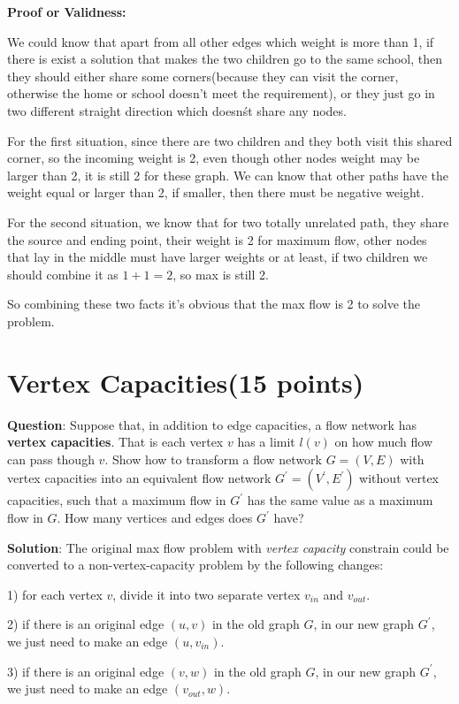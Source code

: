 \documentclass{article}
\begin{document}
\textbf{Proof or Validness:}

We could know that apart from all other edges which weight is more than 1, if there is exist a solution that makes the
two children go to the same school, then they should either share some corners(because they can visit the corner, otherwise the home or school doesn't meet the requirement), or they just go in two different straight direction which
doesn\'st share any nodes.

For the first situation, since there are two children and they both visit this shared corner, so the incoming weight is
2, even though other nodes weight may be larger than 2, it is still 2 for these graph. We can know that other paths have
the weight equal or larger than 2, if smaller, then there must be negative weight.

For the second situation, we know that for two totally unrelated path, they share the source and ending point, their weight is 2 for maximum flow, other nodes that lay in the middle must have larger weights or at least, if two children we should combine it as $ 1 + 1 = 2 $, so max is still 2. 

So combining these two facts it's obvious that the max flow is 2 to solve the problem.

\section{Vertex Capacities(15 points)}
\textbf{Question}: Suppose that, in addition to edge capacities, a flow network has \textbf{vertex capacities}. That is each vertex $v$ has a limit $l(v)$ on how much flow can pass though $v$. Show how to transform a flow network $G=(V, E)$ with vertex capacities into an equivalent flow network $G^{'} = (V^{'},  E^{'})$ without vertex capacities, such that a maximum flow in $G^{'}$ has the same value as a maximum flow in $G$. How many vertices and edges does $G^{'}$ have?\newline

\textbf{Solution}: The original max flow problem with \textsl{vertex capacity} constrain could be converted to a non-vertex-capacity problem by the following changes:

1) for each vertex $v$, divide it into two separate vertex $v_{in}$ and $v_{out}$.

2) if there is an original edge $(u, v)$ in the old graph $G$, in our new graph $G^{'}$, we just need to make an
edge $(u, v_{in})$.

3) if there is an original edge $(v, w)$ in the old graph $G$, in our new graph $G^{'}$, we just need to make an
edge $(v_{out}, w)$.
\end{document}
